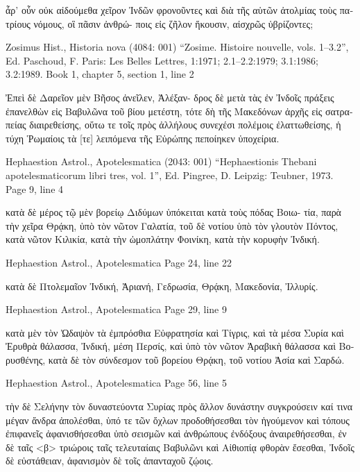\documentclass[12pt,letterpaper,twoside,final]{memoir}
\begin{document}
\begin{greek}
              ἆρ' οὖν οὐκ αἰδούμεθα χεῖρον Ἰνδῶν φρονοῦντες καὶ 
διὰ τῆς αὑτῶν ἀτολμίας τοὺς πατρίους νόμους, οἳ πᾶσιν ἀνθρώ-
ποις εἰς ζῆλον ἥκουσιν, αἰσχρῶς ὑβρίζοντες; 



Zosimus Hist., Historia nova (4084: 001)
“Zosime. Histoire nouvelle, vols. 1–3.2”, Ed. Paschoud, F.
Paris: Les Belles Lettres, 1:1971; 2.1–2.2:1979; 3.1:1986; 3.2:1989.
Book 1, chapter 5, section 1, line 2

Ἐπεὶ δὲ Δαρεῖον μὲν Βῆσος ἀνεῖλεν, Ἀλέξαν-
δρος δὲ μετὰ τὰς ἐν Ἰνδοῖς πράξεις ἐπανελθὼν εἰς 
Βαβυλῶνα τοῦ βίου μετέστη, τότε δὴ τῆς Μακεδόνων 
ἀρχῆς εἰς σατραπείας διαιρεθείσης, οὕτω τε τοῖς πρὸς 
ἀλλήλους συνεχέσι πολέμοις ἐλαττωθείσης, ἡ τύχη 
Ῥωμαίοις τὰ [τε] λειπόμενα τῆς Εὐρώπης πεποίηκεν 
ὑποχείρια. 



Hephaestion Astrol., Apotelesmatica (2043: 001)
“Hephaestionis Thebani apotelesmaticorum libri tres, vol. 1”, Ed. Pingree, D.
Leipzig: Teubner, 1973.
Page 9, line 4

                                                κατὰ δὲ μέρος   
τῷ μὲν βορείῳ Διδύμων ὑπόκειται κατὰ τοὺς πόδας Βοιω-
τία, παρὰ τὴν χεῖρα Θρᾴκη, ὑπὸ τὸν νῶτον Γαλατία, τοῦ 
δὲ νοτίου ὑπὸ τὸν γλουτὸν Πόντος, κατὰ νῶτον Κιλικία, 
κατὰ τὴν ὠμοπλάτην Φοινίκη, κατὰ τὴν κορυφὴν Ἰνδική. 



Hephaestion Astrol., Apotelesmatica 
Page 24, line 22

κατὰ δὲ Πτολεμαῖον Ἰνδική, Ἀριανή, Γεδρωσία, Θρᾴκη, 
Μακεδονία, Ἰλλυρίς. 



Hephaestion Astrol., Apotelesmatica 
Page 29, line 9

                                κατὰ μὲν τὸν Ὠδαψὸν τὰ 
ἐμπρόσθια Εὐφρατησία καὶ Τίγρις, καὶ τὰ μέσα Συρία καὶ 
Ἐρυθρὰ θάλασσα, Ἰνδική, μέση Περσίς, καὶ ὑπὸ τὸν 
νῶτον Ἀραβικὴ θάλασσα καὶ Βορυσθένης, κατὰ δὲ τὸν 
σύνδεσμον τοῦ βορείου Θρᾴκη, τοῦ νοτίου Ἀσία καὶ 
Σαρδώ. 



Hephaestion Astrol., Apotelesmatica 
Page 56, line 5

                                           τὴν δὲ Σελήνην τὸν 
δυναστεύοντα Συρίας πρὸς ἄλλον δυνάστην συγκρούσειν   
καί τινα μέγαν ἄνδρα ἀπολέσθαι, ὑπό τε τῶν ὄχλων 
προδοθήσεσθαι τὸν ἡγούμενον καὶ τόπους ἐπιφανεῖς 
ἀφανισθήσεσθαι ὑπὸ σεισμῶν καὶ ἀνθρώπους ἐνδόξους 
ἀναιρεθήσεσθαι, ἐν δὲ ταῖς <β> τριώροις ταῖς τελευταίαις 
Βαβυλῶνι καὶ Αἰθιοπίᾳ φθορὰν ἔσεσθαι, Ἰνδοῖς δὲ 
εὐστάθειαν, ἀφανισμὸν δὲ τοῖς ἁπανταχοῦ ζῴοις. 




\end{greek}
\end{document}
